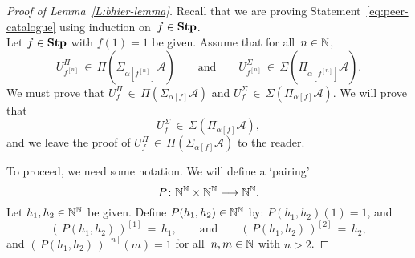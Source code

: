 \documentclass[main.tex]{subfiles}
\begin{document}
\begin{proof}[Proof of Lemma~\ref{L:bhier-lemma}]
\vspace{.6em}
\noindent
Recall that we are proving Statement~\eqref{eq:peer-catalogue}
using induction on~$f\in\mathbf{Stp}$.\\
Let $f\in\mathbf{Stp}$
with $f(1)=1$ be given.
Assume that for all~$n\in\mathbb{N}$,
\begin{equation*}
U^\Pi_{f^{[n]}} \,\in\, \Pi(\Sigma_{\alpha[f^{[n]}]}\mathcal{A})
\qquad\text{and}\qquad
U^\Sigma_{f^{[n]}} \,\in\, \Sigma(\Pi_{\alpha[f^{[n]}]}\mathcal{A}).
\end{equation*}
We must prove that 
$U^\Pi_f \,\in\, \Pi(\Sigma_{\alpha[f]} \mathcal{A})$
and $U^\Sigma_f \,\in\, \Sigma(\Pi_{\alpha[f]} \mathcal{A})$.
We will prove that
\begin{equation}
\label{eq:peer-catalogue-induction}
U^\Sigma_f \,\in\, \Sigma(\Pi_{\alpha[f]} \mathcal{A}),
\end{equation}
and we leave the proof of
$U^\Pi_f \,\in\, \Pi(\Sigma_{\alpha[f]} \mathcal{A})$
to the reader.

To proceed, we need some notation.
We will define a `pairing'
\begin{equation*}
P\colon \mathbb{N}^{\mathbb{N}} \times \mathbb{N}^{\mathbb{N}}\longrightarrow \mathbb{N}^{\mathbb{N}}.
\end{equation*}
Let $h_1,h_2\in\mathbb{N}^{\mathbb{N}}$ be given.
Define $P(h_1,h_2)\in\mathbb{N}^{\mathbb{N}}$
by: $P(h_1,h_2)(1) = 1$, and
\begin{equation*}
(\,P(h_1,h_2)\,)^{[1]} \,=\, h_1,
\qquad\text{and}\qquad
(\,P(h_1,h_2)\,)^{[2]} \,=\, h_2,
\end{equation*}
and $(\,P(h_1,h_2)\,)^{[n]}(m) = 1$
for all~$n,m\in\mathbb{N}$ with $n>2$.


\end{proof}
\end{document}
